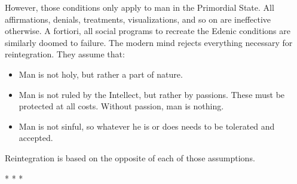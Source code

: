 However, those conditions only apply to man in the Primordial State. All affirmations, denials, treatments, visualizations, and so on are ineffective otherwise. A fortiori, all social programs to recreate the Edenic conditions are similarly doomed to failure. The modern mind rejects everything necessary for reintegration. They assume that:

\begin{itemize}
\item Man is not holy, but rather a part of nature. 
\item Man is not ruled by the Intellect, but rather by passions. These must be protected at all costs. Without passion, man is nothing. 
\item Man is not sinful, so whatever he is or does needs to be tolerated and accepted. 
\end{itemize}
Reintegration is based on the opposite of each of those assumptions.




\begin{center}* * *\end{center}


